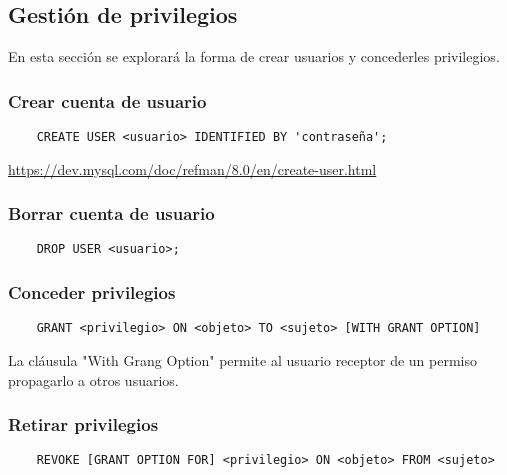 \documentclass{article}
\begin{document}





\subsection{Gestión de privilegios}

En esta sección se explorará la forma de crear usuarios y concederles privilegios.
\subsubsection{Crear cuenta de usuario}
 \begin{verbatim}
 	CREATE USER <usuario> IDENTIFIED BY 'contraseña';
 \end{verbatim}
\url{https://dev.mysql.com/doc/refman/8.0/en/create-user.html}
\subsubsection{Borrar cuenta de usuario}
\begin{verbatim}
	DROP USER <usuario>;
\end{verbatim}
\subsubsection{Conceder privilegios}
\begin{verbatim}
	GRANT <privilegio> ON <objeto> TO <sujeto> [WITH GRANT OPTION]
\end{verbatim}
La cláusula "With Grang Option" permite al usuario receptor de un permiso propagarlo a otros usuarios.
\subsubsection{Retirar privilegios}
\begin{verbatim}
	REVOKE [GRANT OPTION FOR] <privilegio> ON <objeto> FROM <sujeto>
\end{verbatim}
 
\end{document}
